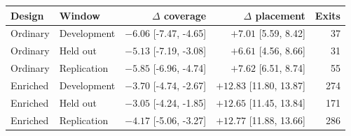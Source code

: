 \begin{tabular}{@{}llrrr@{}}\toprule
Design & Window & $\Delta$ coverage & $\Delta$ placement & Exits\\\midrule
Ordinary & Development & $-6.06$ [-7.47, -4.65] & $+7.01$ [5.59, 8.42] & 37\\
Ordinary & Held out & $-5.13$ [-7.19, -3.08] & $+6.61$ [4.56, 8.66] & 31\\
Ordinary & Replication & $-5.85$ [-6.96, -4.74] & $+7.62$ [6.51, 8.74] & 55\\
Enriched & Development & $-3.70$ [-4.74, -2.67] & $+12.83$ [11.80, 13.87] & 274\\
Enriched & Held out & $-3.05$ [-4.24, -1.85] & $+12.65$ [11.45, 13.84] & 171\\
Enriched & Replication & $-4.17$ [-5.06, -3.27] & $+12.77$ [11.88, 13.66] & 286\\
\bottomrule\end{tabular}
